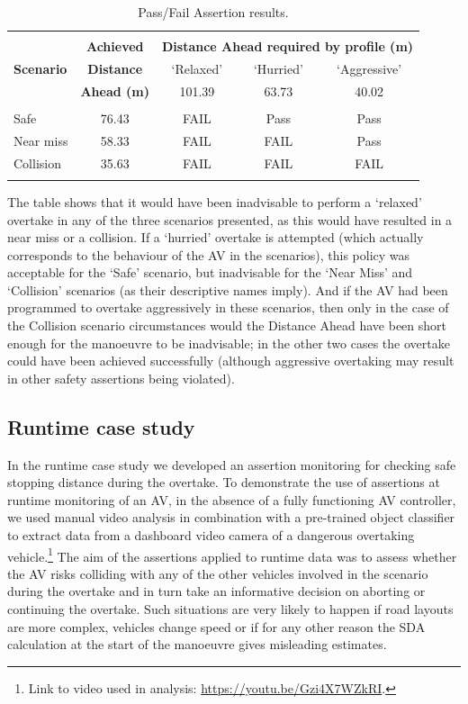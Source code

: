 \begin{table}[h]
\centering
\begin{tabular}{lcccc}
\hline
\\
\multirow{3}{*}{\textbf{Scenario}} & \textbf{Achieved} & \multicolumn{3}{c}{\textbf{Distance Ahead required by profile (m)}}\\
& \textbf{Distance} & `Relaxed' & `Hurried' & `Aggressive' \\
& \textbf{Ahead (m)} & 101.39 & 63.73 & 40.02 \\
\\
%
Safe & 76.43 & FAIL & Pass & Pass\\
%
Near miss & 58.33 & FAIL & FAIL & Pass\\
%
Collision & 35.63 & FAIL & FAIL & FAIL\\
\\
\hline
\end{tabular}
\caption{Pass/Fail Assertion results.} \label{Overtaking_Profiles}
\end{table}

The table shows that it would have been inadvisable to perform a `relaxed' overtake in any of the three scenarios presented, as this would have resulted in a near miss or a collision. If a `hurried' overtake is attempted (which actually corresponds to the behaviour of the AV in the scenarios), this policy was acceptable for the `Safe' scenario, but inadvisable for the `Near Miss' and `Collision' scenarios (as their descriptive names imply). And if the AV had been programmed to overtake aggressively in these scenarios, then only in the case of the Collision scenario circumstances would the Distance Ahead have been short enough for the manoeuvre to be inadvisable; in the other two cases the overtake could have been achieved successfully (although aggressive overtaking may result in other safety assertions being violated).

\subsection{Runtime case study}
In the runtime case study we developed an assertion monitoring for checking safe stopping distance during the overtake. 
%
To demonstrate the use of assertions at runtime monitoring of an AV, in the absence of a fully functioning AV controller, we used manual video analysis in combination with a pre-trained object classifier to extract data from a dashboard video camera of a dangerous overtaking vehicle.\footnote{Link to video used in analysis: \url{https://youtu.be/Gzi4X7WZkRI}.} 
%
The aim of the assertions applied to runtime data was to assess whether the AV risks colliding with any of the other vehicles involved in the scenario during the overtake and in turn take an informative decision on aborting or continuing the overtake. 
%
Such situations are very likely to happen if road layouts are more complex, vehicles change speed or if for any other reason the SDA calculation at the start of the manoeuvre gives misleading estimates. 

